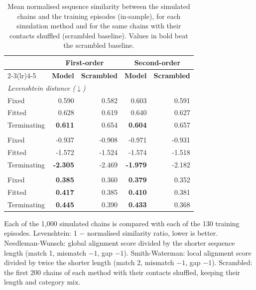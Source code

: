 \begin{table}[htbp]
\centering
\small
\caption{Mean normalised sequence similarity between the simulated chains and the training episodes (in-sample), for each simulation method and for the same chains with their contacts shuffled (scrambled baseline). Values in bold beat the scrambled baseline.}
\label{tab:similarity}
\setlength{\tabcolsep}{4pt}
\begin{tabular*}{\linewidth}{@{\extracolsep{\fill}}lrrrr}
\toprule
 & \multicolumn{2}{c}{\textbf{First-order}} & \multicolumn{2}{c}{\textbf{Second-order}} \\
\cmidrule(lr){2-3}\cmidrule(lr){4-5}
 & \textbf{Model} & \textbf{Scrambled} & \textbf{Model} & \textbf{Scrambled} \\
\midrule
\multicolumn{5}{l}{\textit{Levenshtein distance ($\downarrow$)}} \\
\quad Fixed & 0.590 & 0.582 & 0.603 & 0.591 \\
\quad Fitted & 0.628 & 0.619 & 0.640 & 0.627 \\
\quad Terminating & \textbf{0.611} & 0.654 & \textbf{0.604} & 0.657 \\
\addlinespace
\multicolumn{5}{l}{\textit{Needleman-Wunsch score ($\uparrow$)}} \\
\quad Fixed & -0.937 & -0.908 & -0.971 & -0.931 \\
\quad Fitted & -1.572 & -1.524 & -1.574 & -1.518 \\
\quad Terminating & \textbf{-2.305} & -2.469 & \textbf{-1.979} & -2.182 \\
\addlinespace
\multicolumn{5}{l}{\textit{Smith-Waterman score ($\uparrow$)}} \\
\quad Fixed & \textbf{0.385} & 0.360 & \textbf{0.379} & 0.352 \\
\quad Fitted & \textbf{0.417} & 0.385 & \textbf{0.410} & 0.381 \\
\quad Terminating & \textbf{0.445} & 0.390 & \textbf{0.433} & 0.368 \\
\bottomrule
\end{tabular*}
\par\smallskip
\begin{minipage}{\linewidth}\footnotesize
Each of the 1,000 simulated chains is compared with each of the 130 training episodes. Levenshtein: 1 $-$ normalised similarity ratio, lower is better. Needleman-Wunsch: global alignment score divided by the shorter sequence length (match 1, mismatch $-1$, gap $-1$). Smith-Waterman: local alignment score divided by twice the shorter length (match 2, mismatch $-1$, gap $-1$). Scrambled: the first 200 chains of each method with their contacts shuffled, keeping their length and category mix.
\end{minipage}
\end{table}
